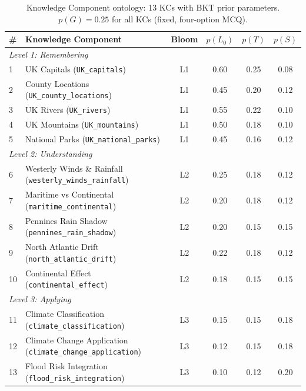 \begin{table}[H]
\centering
\caption{Knowledge Component ontology: 13 KCs with BKT prior parameters.
  $p(G) = 0.25$ for all KCs (fixed, four-option MCQ).}
\label{tab:kc_table}
\renewcommand{\arraystretch}{1.25}
\begin{tabularx}{\textwidth}{lXcccc}
\toprule
\textbf{\#} & \textbf{Knowledge Component} & \textbf{Bloom} &
  $p(L_0)$ & $p(T)$ & $p(S)$ \\
\midrule
\multicolumn{6}{l}{\textit{Level 1: Remembering}} \\
1  & UK Capitals (\texttt{UK\_capitals})                   & L1 & 0.60 & 0.25 & 0.08 \\
2  & County Locations (\texttt{UK\_county\_locations})     & L1 & 0.45 & 0.20 & 0.12 \\
3  & UK Rivers (\texttt{UK\_rivers})                       & L1 & 0.55 & 0.22 & 0.10 \\
4  & UK Mountains (\texttt{UK\_mountains})                 & L1 & 0.50 & 0.18 & 0.10 \\
5  & National Parks (\texttt{UK\_national\_parks})         & L1 & 0.45 & 0.16 & 0.12 \\
\multicolumn{6}{l}{\textit{Level 2: Understanding}} \\
6  & Westerly Winds \& Rainfall (\texttt{westerly\_winds\_rainfall})    & L2 & 0.25 & 0.18 & 0.12 \\
7  & Maritime vs Continental (\texttt{maritime\_continental})           & L2 & 0.20 & 0.18 & 0.12 \\
8  & Pennines Rain Shadow (\texttt{pennines\_rain\_shadow})             & L2 & 0.20 & 0.15 & 0.15 \\
9  & North Atlantic Drift (\texttt{north\_atlantic\_drift})             & L2 & 0.22 & 0.18 & 0.12 \\
10 & Continental Effect (\texttt{continental\_effect})                  & L2 & 0.18 & 0.15 & 0.15 \\
\multicolumn{6}{l}{\textit{Level 3: Applying}} \\
11 & Climate Classification (\texttt{climate\_classification})          & L3 & 0.15 & 0.15 & 0.18 \\
12 & Climate Change Application (\texttt{climate\_change\_application}) & L3 & 0.12 & 0.15 & 0.18 \\
13 & Flood Risk Integration (\texttt{flood\_risk\_integration})         & L3 & 0.10 & 0.12 & 0.20 \\
\bottomrule
\end{tabularx}
\end{table}

